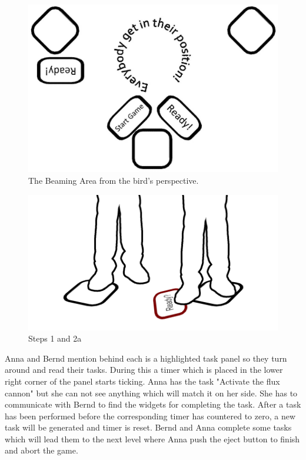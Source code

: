 \documentclass{sigchi}
\begin{document}
\begin{figure}[h]
\centering
\includegraphics[width=0.8\columnwidth]{beamingArea}
\caption{The Beaming Area from the bird's perspective.}
\label{fig:beamingArea}
\end{figure}


\begin{figure}[H]
\centering
\includegraphics[width=0.9\columnwidth]{walkthrough/klein/beamingarea1+2a}
\caption{Steps 1 and 2a}
\label{fig:gamingArea}
\end{figure}

Anna and Bernd mention behind each is a highlighted task panel so they turn around and read their tasks. During this a timer which is placed in the lower right corner of the panel starts ticking. Anna has the task "Activate the flux cannon" but she can not see anything which will match it on her side. She has to communicate with Bernd to find the widgets for completing the task. After a task has been performed before the corresponding timer has countered to zero, a new task will be generated and timer is reset. Bernd and Anna complete some tasks which will lead them to the next level where Anna push the eject button to finish and abort the game.
\end{document}
